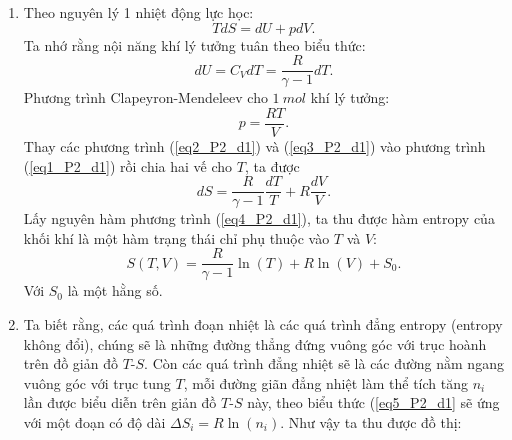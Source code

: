 \begin{enumerate}[label=\textbf{\alph*,}]\itemsep0em
\item Theo nguyên lý 1 nhiệt động lực học:
\begin{equation} \label{eq1_P2_d1}
    T dS = dU + pdV.
\end{equation}
Ta nhớ rằng nội năng khí lý tưởng tuân theo biểu thức:
\begin{equation} \label{eq2_P2_d1}
    dU = C_V dT = \frac{R}{\gamma-1} dT.
\end{equation}
Phương trình Clapeyron-Mendeleev cho $\SI{1}{mol}$ khí lý tưởng: 
\begin{equation} \label{eq3_P2_d1}
    p=\frac{RT}{V}.
\end{equation}
Thay các phương trình (\ref{eq2_P2_d1}) và (\ref{eq3_P2_d1}) vào phương trình (\ref{eq1_P2_d1}) rồi chia hai vế cho $T$, ta được
\begin{equation} \label{eq4_P2_d1}
    dS = \frac{R}{\gamma-1} \frac{dT}{T} + R \frac{dV}{V}.
\end{equation}
Lấy nguyên hàm phương trình (\ref{eq4_P2_d1}), ta thu được hàm entropy của khối khí là một hàm trạng thái chỉ phụ thuộc vào $T$ và $V$:
\begin{equation} \label{eq5_P2_d1}
    S(T,V)= \frac{R}{\gamma-1} \ln (T) + R \ln (V) + S_0.
\end{equation}
Với $S_0$ là một hằng số.

\item Ta biết rằng, các quá trình đoạn nhiệt là các quá trình đẳng entropy (entropy không đổi), chúng sẽ là những đường thẳng đứng vuông góc với trục hoành trên đồ giản đồ $T$-$S$. Còn các quá trình đẳng nhiệt sẽ là các đường nằm ngang vuông góc với trục tung $T$, mỗi đường giãn đẳng nhiệt làm thể tích tăng $n_i$ lần được biểu diễn trên giản đồ $T$-$S$ này, theo biểu thức (\ref{eq5_P2_d1} sẽ ứng với một đoạn có độ dài $\Delta S_i = R \ln (n_i)$. Như vậy ta thu được đồ thị:


\end{enumerate}
